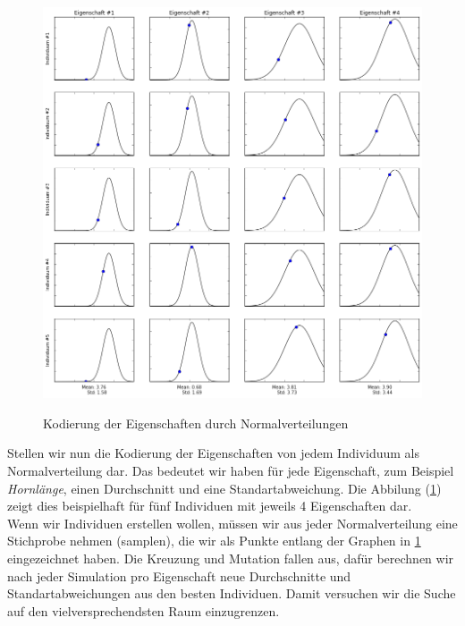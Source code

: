             \begin{figure}[H]
                    \begin{center}
                        \includegraphics[scale=0.47]{../pictures/diagrams/cross-entropy-visualization-ga.png}\\
                        \caption{Kodierung der Eigenschaften durch Normalverteilungen}\label{fig:norm-dist-encoding}
                    \end{center}
            \end{figure}

            Stellen wir nun die Kodierung der Eigenschaften von jedem Individuum als Normalverteilung dar. Das bedeutet wir haben für jede Eigenschaft, zum Beispiel \textit{Hornlänge}, einen Durchschnitt und eine Standartabweichung. Die Abbilung (\ref{fig:norm-dist-encoding}) zeigt dies beispielhaft für fünf Individuen mit jeweils 4 Eigenschaften dar.\\[3mm]

            \newpage
            \noindent
            Wenn wir Individuen erstellen wollen, müssen wir aus jeder Normalverteilung eine Stichprobe nehmen (samplen), die wir als Punkte entlang der Graphen in \ref{fig:norm-dist-encoding} eingezeichnet haben.  Die Kreuzung und Mutation fallen aus, dafür berechnen wir nach jeder Simulation pro Eigenschaft neue Durchschnitte und Standartabweichungen aus den besten Individuen. Damit versuchen wir die Suche auf den vielversprechendsten Raum einzugrenzen.\\


